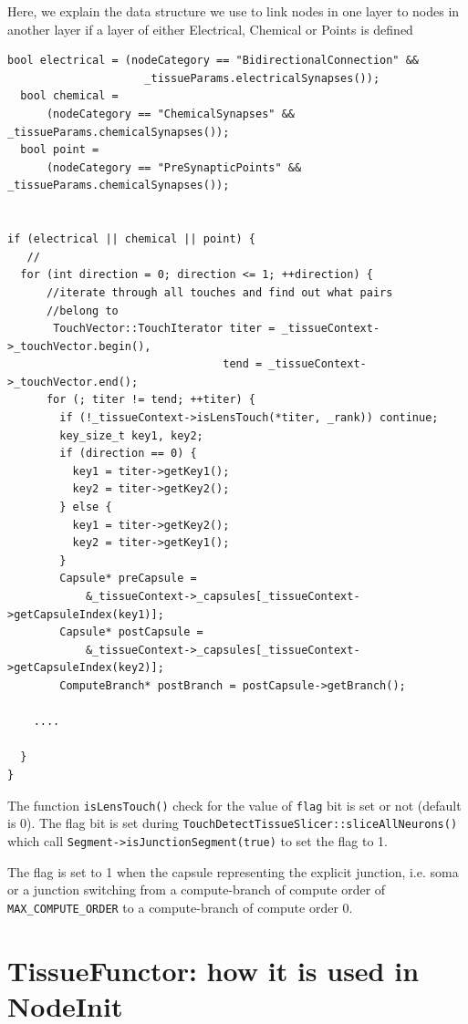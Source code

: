 Here, we explain the data structure we use to link nodes in one layer to nodes
in another layer if a layer of either Electrical, Chemical or Points is defined

\begin{lstlisting}[basicstyle=\tiny %or \small or \footnotesize etc.
]
bool electrical = (nodeCategory == "BidirectionalConnection" &&
                     _tissueParams.electricalSynapses());
  bool chemical =
      (nodeCategory == "ChemicalSynapses" && _tissueParams.chemicalSynapses());
  bool point =
      (nodeCategory == "PreSynapticPoints" && _tissueParams.chemicalSynapses());


if (electrical || chemical || point) {
   //   
  for (int direction = 0; direction <= 1; ++direction) {
      //iterate through all touches and find out what pairs
      //belong to 
       TouchVector::TouchIterator titer = _tissueContext->_touchVector.begin(),
                                 tend = _tissueContext->_touchVector.end();
      for (; titer != tend; ++titer) {
        if (!_tissueContext->isLensTouch(*titer, _rank)) continue;
        key_size_t key1, key2;
        if (direction == 0) {
          key1 = titer->getKey1();
          key2 = titer->getKey2();
        } else {
          key1 = titer->getKey2();
          key2 = titer->getKey1();
        }
        Capsule* preCapsule =
            &_tissueContext->_capsules[_tissueContext->getCapsuleIndex(key1)];
        Capsule* postCapsule =
            &_tissueContext->_capsules[_tissueContext->getCapsuleIndex(key2)];
        ComputeBranch* postBranch = postCapsule->getBranch();
 
    ....

  }
}
\end{lstlisting}

The function \verb!isLensTouch()! check for the value of \verb!flag! bit is set
or not (default is 0). The flag bit is set during
\verb!TouchDetectTissueSlicer::sliceAllNeurons()! which call
\verb!Segment->isJunctionSegment(true)! to set the flag to 1.

The flag is set to 1 when the capsule representing the explicit junction, i.e.
soma or a junction switching from a compute-branch of compute order of
\verb!MAX_COMPUTE_ORDER! to a compute-branch of compute order 0.



\section{TissueFunctor: how it is used in NodeInit}
\label{sec:TissueFunctor-as-nodeinit-functor}

